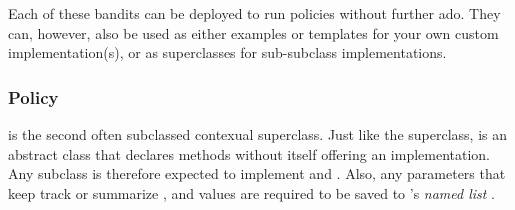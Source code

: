 \documentclass{jss}\usepackage[]{graphicx}\usepackage[]{color}
\begin{document}
Each of these bandits can be deployed to run policies without further ado. They can, however, also be used as either examples or templates for your own custom  implementation(s), or as superclasses for sub-subclass implementations.

\subsubsection{Policy}

 is the second often subclassed contexual superclass. Just like the  superclass,  is an abstract class that declares methods without itself offering an implementation. Any  subclass is therefore expected to implement  and . Also, any parameters that keep track or summarize ,  and  values are required to be saved to 's \textit{named list} .
\end{document}
